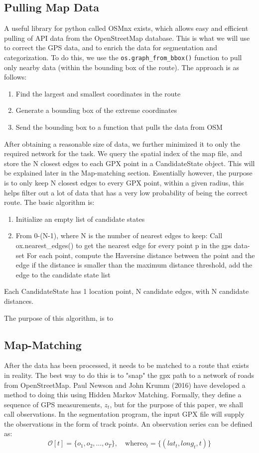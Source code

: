 \documentclass[12pt,a4paper]{report}
\begin{document}
\subsection{Pulling Map Data}
A useful library for python called OSMnx exists, which allows easy and efficient pulling of API data from the OpenStreetMap database. This is what we will use to correct the GPS data, and to enrich the data for segmentation and categorization.
To do this, we use the \texttt{os.graph\_from\_bbox()} function to pull only nearby data (within the bounding box of the route). The approach is as follows:
\begin{enumerate}
	\item Find the largest and smallest coordinates in the route
	\item Generate a bounding box of the extreme coordinates
	\item Send the bounding box to a function that pulls the data from OSM
\end{enumerate}
After obtaining a reasonable size of data, we further minimized it to only the required network for the task. We query the spatial index of the map file,
and store the N closest edges to each GPX point in a CandidateState object. This will be explained later in the Map-matching section.
Essentially however, the purpose is to only keep N closest edges to every GPX point, within a given radius, this helps filter out a lot of data that has a very
low probability of being the correct route. The basic algorithm is:
\begin{enumerate}
  \item Initialize an empty list of candidate states
  \item From 0-(N-1), where N is the number of nearest edges to keep: 
    \subitem Call ox.nearest\_edges() to get the nearest edge for every point p in the gps data-set
    \subitem For each point, compute the Haversine distance between the point and the edge
   \subitem if the distance is smaller than the maximum distance threshold, add the edge to the candidate state list
\end{enumerate}
Each CandidateState has 1 location point, N candidate edges, with N candidate distances. 


The purpose of this algorithm, is to 



\subsection{Map-Matching}
After the data has been processed, it needs to be matched to a route that exists in reality. The best way to do this is to "snap" the gpx path to a network of roads from OpenStreetMap.
Paul Newson and John Krumm (2016) have developed a method to doing this using Hidden Markov Matching.
Formally, they define a sequence of GPS measurements, $z_t$, but for the purpose of this paper, we shall call observations.
In the segmentation program, the input GPX file will supply the observations in the form of track points.
An observation series can be defined as:
\\
\[
	\mathcal{O}[t] = \{o_1,o_2,\dots,o_T\}, \quad \text{where} o_t = \{(lat_t,long_t,t)\}
\]
\end{document}
